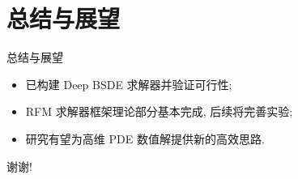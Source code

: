 \documentclass[aspectratio=169,10pt]{beamer}
\begin{document}
    \section{总结与展望}
    \begin{frame}{总结与展望}
        \begin{itemize}
            \item 已构建 Deep BSDE 求解器并验证可行性;
            \item RFM 求解器框架理论部分基本完成, 后续将完善实验;
            \item 研究有望为高维 PDE 数值解提供新的高效思路.
        \end{itemize}
        \vfill
        \centering
        {\large 谢谢!}
    \end{frame}
\end{document}
